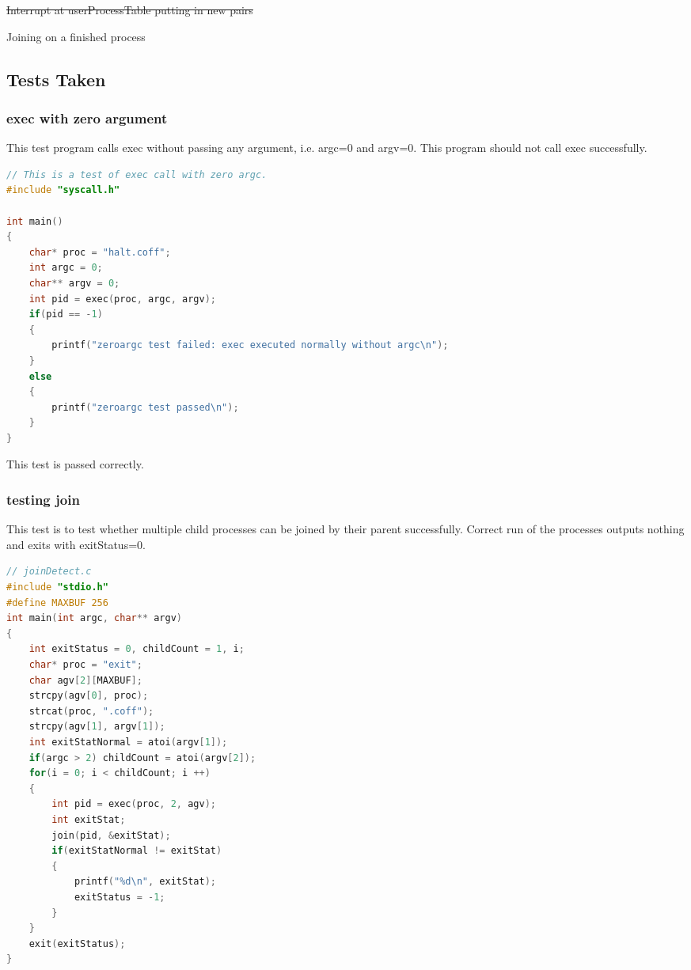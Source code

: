 \documentclass{article}
\begin{document}
\begin{spacing}{1.1}
\begin{asparaitem}
  \item {\color{red}\sout{Interrupt at userProcessTable putting in new pairs}}
  \item Joining on a finished process
\end{asparaitem}

\subsection{Tests Taken}
\subsubsection{\textsf{exec} with zero argument}
This test program calls \textsf{exec} without passing any argument, i.e. \textsf{argc}=0 and \textsf{argv}=0. This program should not call \textsf{exec} successfully.
\begin{lstlisting}[language=C]
// This is a test of exec call with zero argc.
#include "syscall.h"

int main()
{
    char* proc = "halt.coff";
    int argc = 0;
    char** argv = 0;
    int pid = exec(proc, argc, argv);
    if(pid == -1)
    {
        printf("zeroargc test failed: exec executed normally without argc\n");
    }
    else
    {
        printf("zeroargc test passed\n");
    }
}
\end{lstlisting}
This test is passed correctly.
\subsubsection{testing \textsf{join}}
This test is to test whether multiple child processes can be joined by their parent successfully. Correct run of the processes outputs nothing and exits with \textsf{exitStatus}=0.
\begin{lstlisting}[language=C]
// joinDetect.c
#include "stdio.h"
#define MAXBUF 256
int main(int argc, char** argv)
{
    int exitStatus = 0, childCount = 1, i;
    char* proc = "exit";
    char agv[2][MAXBUF];
    strcpy(agv[0], proc);
    strcat(proc, ".coff");
    strcpy(agv[1], argv[1]);
    int exitStatNormal = atoi(argv[1]);
    if(argc > 2) childCount = atoi(argv[2]);
    for(i = 0; i < childCount; i ++)
    {
        int pid = exec(proc, 2, agv);
        int exitStat;
        join(pid, &exitStat);
        if(exitStatNormal != exitStat)
        {
            printf("%d\n", exitStat);
            exitStatus = -1;
        }
    }
    exit(exitStatus);
}


\end{lstlisting}
\end{spacing}
\end{document}
